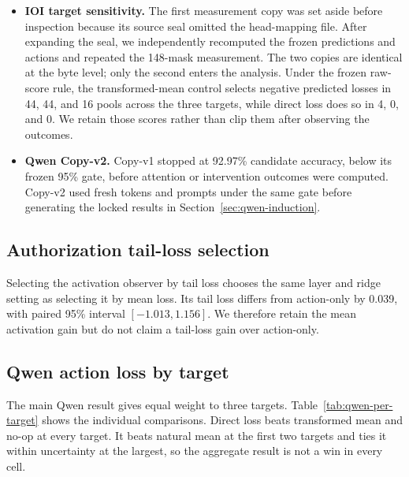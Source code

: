 \begin{itemize}
  \item \textbf{IOI target sensitivity.} The first measurement copy was set
  aside before inspection because its source seal omitted the head-mapping file.
  After expanding the seal, we independently recomputed the frozen predictions
  and actions and repeated the 148-mask measurement. The two copies are
  identical at the byte level; only the second enters the analysis. Under the frozen
  raw-score rule, the transformed-mean control selects negative predicted
  losses in 44, 44, and 16 pools across the three targets, while direct loss
  does so in 4, 0, and 0. We retain those scores rather than clip them after
  observing the outcomes.
  \item \textbf{Qwen Copy-v2.} Copy-v1 stopped at 92.97\% candidate accuracy,
  below its frozen 95\% gate, before attention or intervention outcomes were
  computed. Copy-v2 used fresh tokens and prompts under the same gate before
  generating the locked results in Section~\ref{sec:qwen-induction}.
\end{itemize}

\subsection{Authorization tail-loss selection}

Selecting the activation observer by tail loss chooses the same layer and ridge
setting as selecting it by mean loss. Its tail loss differs from action-only by
0.039, with paired 95\% interval $[-1.013,1.156]$. We therefore retain the mean
activation gain but do not claim a tail-loss gain over action-only.

\subsection{Qwen action loss by target}

The main Qwen result gives equal weight to three targets.
Table~\ref{tab:qwen-per-target} shows the individual comparisons. Direct loss
beats transformed mean and no-op at every target. It beats natural mean at the
first two targets and ties it within uncertainty at the largest, so the
aggregate result is not a win in every cell.


